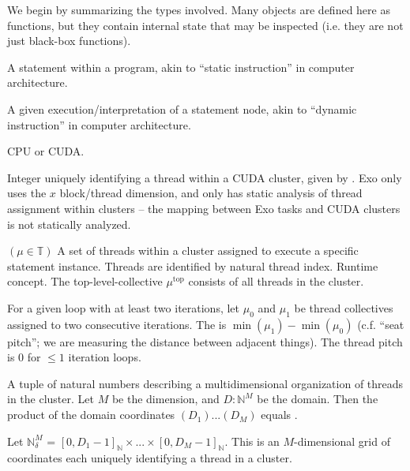 




We begin by summarizing the types involved.
Many objects are defined here as functions, but they contain internal state that may be inspected (i.e. they are not just black-box functions).

\filbreak
{} A statement within a program, akin to ``static instruction'' in computer architecture.

\filbreak
{} A given execution/interpretation of a statement node, akin to ``dynamic instruction'' in computer architecture.

\filbreak
{} CPU or CUDA.

\filbreak
{} Integer uniquely identifying a thread within a CUDA cluster, given by .
Exo only uses the $x$ block/thread dimension, and only has static analysis of thread assignment within clusters -- the mapping between Exo tasks and CUDA clusters is not statically analyzed.

\filbreak
{} $(\mu \in \mathbb{T})$ A set of threads within a cluster assigned to execute a specific statement instance.
Threads are identified by natural thread index.
Runtime concept.
The top-level-collective $\mu^\text{top}$ consists of all threads in the cluster.

For a given  loop with at least two iterations, let $\mu_0$ and $\mu_1$ be thread collectives assigned to two consecutive iterations.
The  is $\min(\mu_1) - \min(\mu_0)$
(c.f. ``seat pitch''; we are measuring the distance between adjacent things).
The thread pitch is 0 for $\le 1$ iteration loops.

\filbreak
{} A tuple of natural numbers describing a multidimensional organization of threads in the cluster.
Let $M$ be the dimension, and $D: \mathbb{N}^M$ be the domain.
Then the product of the domain coordinates $(D_1) ...(D_M)$ equals .

Let $\mathbb{N}^M_\delta$ = $[0, D_1 - 1]_\mathbb{N} \times ... \times [0, D_M - 1]_\mathbb{N}$.
This is an $M$-dimensional grid of coordinates each uniquely identifying a thread in a cluster.


